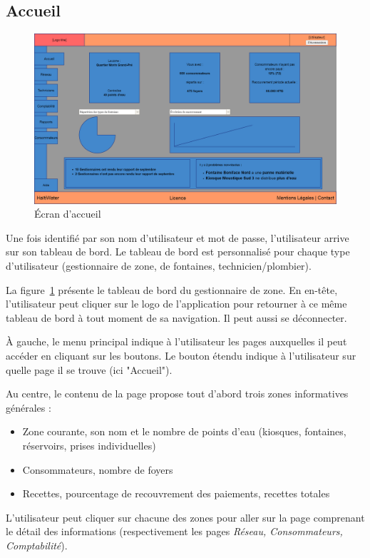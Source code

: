 \documentclass[a4paper, 11pt]{article}
\begin{document}
  \subsection{Accueil}

    \begin{figure}[H]
        \centering
        \includegraphics[width=.8\textwidth]{Cahier_des_Charges/accueil}
        \caption{\'Ecran d'accueil}
        \label{fig:zone_dashboard}
    \end{figure}

    Une fois identifié par son nom d'utilisateur et mot de passe, l'utilisateur arrive sur son tableau de bord. Le tableau de bord est personnalisé pour chaque type d'utilisateur (gestionnaire de zone, de fontaines, technicien/plombier).

    La figure~\ref{fig:zone_dashboard} présente le tableau de bord du gestionnaire de zone. En en-tête, l'utilisateur peut cliquer sur le logo de l'application pour retourner à ce même tableau de bord à tout moment de sa navigation. Il peut aussi se déconnecter.

    À gauche, le menu principal indique à l'utilisateur les pages auxquelles il peut accéder en cliquant sur les boutons. Le bouton étendu indique à l'utilisateur sur quelle page il se trouve (ici "Accueil").

    Au centre, le contenu de la page propose tout d'abord trois zones informatives générales :
    \begin{itemize}
      \item Zone courante, son nom et le nombre de points d'eau (kiosques, fontaines, réservoirs, prises individuelles)
      \item Consommateurs, nombre de foyers
      \item Recettes, pourcentage de recouvrement des paiements, recettes totales
    \end{itemize}
    L'utilisateur peut cliquer sur chacune des zones pour aller sur la page comprenant le détail des informations (respectivement les pages \emph{Réseau, Consommateurs, Comptabilité}).
\end{document}
